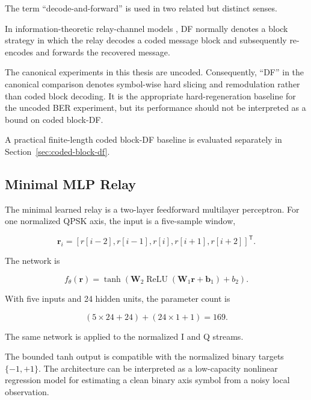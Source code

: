 \begin{remark}
\label{rem:df-terminology}

The term ``decode-and-forward'' is used in two related but distinct
senses.

In information-theoretic relay-channel models
\cite{CoverGamal1979RelayChannel,ElGamalKim2011NetworkIT}, DF normally
denotes a block strategy in which the relay decodes a coded message
block and subsequently re-encodes and forwards the recovered message.

The canonical experiments in this thesis are uncoded. Consequently,
``DF'' in the canonical comparison denotes symbol-wise hard slicing
and remodulation rather than coded block decoding. It is the
appropriate hard-regeneration baseline for the uncoded BER experiment,
but its performance should not be interpreted as a bound on coded
block-DF.

A practical finite-length coded block-DF baseline is evaluated
separately in Section~\ref{sec:coded-block-df}.

\end{remark}


\subsection{Minimal MLP Relay}

The minimal learned relay is a two-layer feedforward multilayer
perceptron. For one normalized QPSK axis, the input is a five-sample
window,

\[
\mathbf r_i
=
[r[i-2],r[i-1],r[i],r[i+1],r[i+2]]^\mathsf{T}.
\]

The network is

\begin{equation}\label{eq:mlp-relay}
f_\theta(\mathbf r)
=
\tanh
\left(
\mathbf W_2
\operatorname{ReLU}
(\mathbf W_1\mathbf r+\mathbf b_1)
+b_2
\right).
\end{equation}

With five inputs and 24 hidden units, the parameter count is

\[
(5\times24+24)+(24\times1+1)=169.
\]

The same network is applied to the normalized I and Q streams.

The bounded tanh output is compatible with the normalized binary
targets $\{-1,+1\}$. The architecture can be interpreted as a
low-capacity nonlinear regression model for estimating a clean binary
axis symbol from a noisy local observation.

